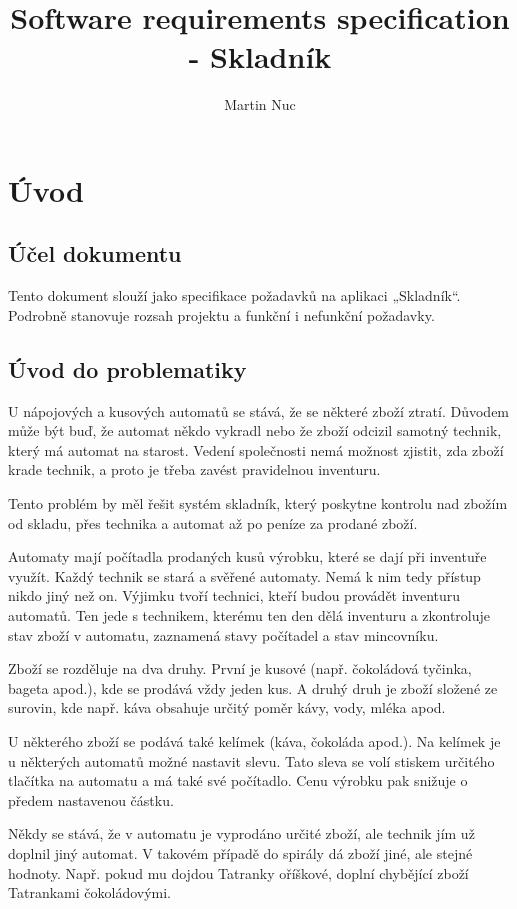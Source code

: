 \documentclass[a4paper,10pt]{article}
\title{Software requirements specification - Skladník}
\author{Martin Nuc}
\begin{document}
\maketitle

\tableofcontents
\section{Úvod}
\subsection{Účel dokumentu}
Tento dokument slouží jako specifikace požadavků na aplikaci „Skladník“. Podrobně stanovuje rozsah projektu a funkční i nefunkční požadavky.

\subsection{Úvod do problematiky}
U nápojových a kusových automatů se stává, že se některé zboží ztratí. Důvodem může být buď, že automat někdo vykradl nebo že zboží odcizil samotný technik, který má automat na starost. Vedení společnosti nemá možnost zjistit, zda zboží krade technik, a proto je třeba zavést pravidelnou inventuru.

Tento problém by měl řešit systém skladník, který poskytne kontrolu nad zbožím od skladu, přes technika a automat až po peníze za prodané zboží.

Automaty mají počítadla prodaných kusů výrobku, které se dají při inventuře využít. Každý technik se stará a svěřené automaty. Nemá k nim tedy přístup nikdo jiný než on. Výjimku tvoří technici, kteří budou provádět inventuru automatů. Ten jede s technikem, kterému ten den dělá inventuru a zkontroluje stav zboží v automatu, zaznamená stavy počítadel a stav mincovníku.

Zboží se rozděluje na dva druhy. První je kusové (např. čokoládová tyčinka, bageta apod.), kde se prodává vždy jeden kus. A druhý druh je zboží složené ze surovin, kde např. káva obsahuje určitý poměr kávy, vody, mléka apod. 

U některého zboží se podává také kelímek (káva, čokoláda apod.). Na kelímek je u některých automatů možné nastavit slevu. Tato sleva se volí stiskem určitého tlačítka na automatu a má také své počítadlo. Cenu výrobku pak snižuje o předem nastavenou částku.

Někdy se stává, že v automatu je vyprodáno určité zboží, ale technik jím už doplnil jiný automat. V takovém případě do spirály dá zboží jiné, ale stejné hodnoty. Např. pokud mu dojdou Tatranky oříškové, doplní chybějící zboží Tatrankami čokoládovými.
\end{document}
